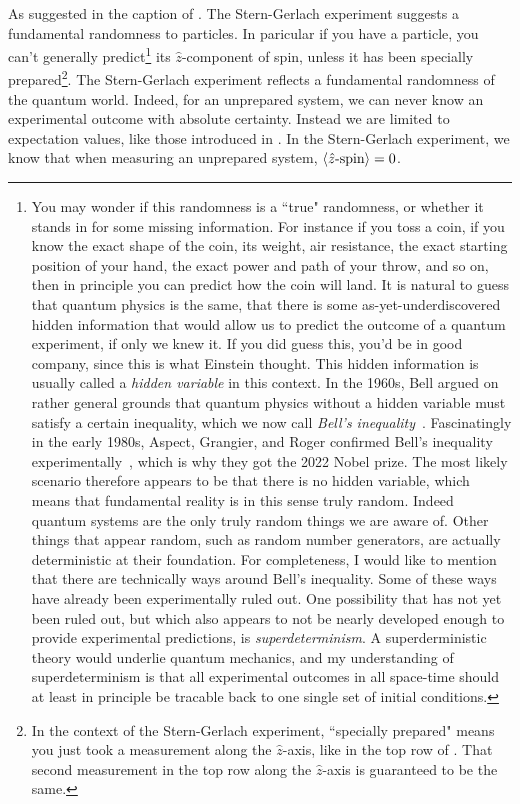 As suggested in the caption of . The Stern-Gerlach
experiment suggests a fundamental randomness to particles. In paricular if you
have a particle, you can't generally predict\footnote{You may wonder if this
randomness is a ``true" randomness, or whether it stands in for some missing
information. For instance if you toss a coin, if you know the exact shape of the
coin, its weight, air resistance, the exact starting position of your hand,
the exact power and path of your throw, and so on, then in principle you can predict how 
the coin will land. It is natural to guess that quantum physics is the same,
that there is some as-yet-underdiscovered hidden information that would allow us
to predict the outcome of a quantum experiment, if only we knew it. If you did
guess this, you'd be in good company, since this 
is what Einstein thought. This hidden information is usually called a {\it
hidden variable} in this context. In the 1960s, Bell
argued on rather general grounds that quantum physics without a hidden variable
must satisfy a certain inequality, which we now call {\it Bell's
inequality}~\cite{bell_einstein_1964}. 
Fascinatingly in the early 1980s, Aspect, Grangier, and Roger confirmed Bell's inequality
experimentally~\cite{aspect_experimental_1982}, which is why they got the 2022
Nobel prize. The most likely scenario
therefore appears to be that there is no hidden variable, which means that fundamental
reality is in this sense truly random. Indeed quantum systems are the only
truly random things we are aware of. Other things that appear random, such as
random number generators, are actually deterministic at their foundation.
For completeness, I would like to mention that there are technically ways around 
Bell's inequality. Some of these ways have already been experimentally ruled
out. One possibility that has not yet been ruled out, but which also appears to
not be nearly developed enough to provide experimental predictions, is {\it
superdeterminism}. A superderministic theory would
underlie quantum mechanics, and my understanding of superdeterminism is that all
experimental outcomes in all space-time should at least in principle be tracable
back to one single set of initial conditions.} 
its $\hat{z}$-component of spin,
unless it has been specially prepared\footnote{In the context of the
Stern-Gerlach experiment, ``specially prepared" means you just took a
measurement along the $\hat{z}$-axis, like in the top row of
. That second measurement in the top row 
along the $\hat{z}$-axis is guaranteed to be the same.}. The
Stern-Gerlach experiment reflects a fundamental randomness of the quantum world.
Indeed, for an unprepared system, we can never know an experimental outcome with
absolute certainty. Instead we are limited to expectation values, like those
introduced in . In the Stern-Gerlach experiment, we
know that when measuring an unprepared system, $\ev{\text{$\hat{z}$-spin}}=0$.


